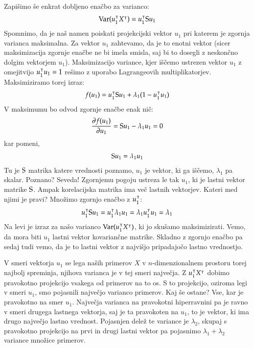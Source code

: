 Zapišimo še enkrat dobljeno enačbo za varianco:
\begin{equation}
  \mathrm{Var}(u_1^\intercal X^\intercal) = u_1^\intercal {\rm S} u_1
\end{equation}
%
Spomnimo, da je naš namen poiskati projekcijski vektor $u_1$ pri katerem je zgornja varianca maksimalna. Za vektor $u_1$ zahtevamo, da je to enotni vektor (sicer maksimizacija zgornje enačbe ne bi imela smisla, saj bi to dosegli z neskončno dolgim vektorjem $u_1$). Maksimizacijo variance, kjer iščemo ustrezen vektor $u_1$ z omejitvijo $u_1^\intercal u_1=1$ rešimo z uporabo Lagrangeovih multiplikatorjev. Maksimiziramo torej izraz:
%
\begin{equation}
  f(u_1) = u_1^\intercal {\rm S} u_1 + \lambda_1(1-u_1^\intercal u_1)
\end{equation}
%
V maksimumu bo odvod zgornje enačbe enak nič:
\begin{equation}
  \frac{\partial f(u_1)}{\partial u_1}={\rm S} u_1 - \lambda_1 u_1=0
\end{equation}
%
kar pomeni,
\begin{equation}
  {\rm S} u_1=\lambda_1 u_1
\end{equation}
%
Tu je ${\rm S}$ matrika katere vrednosti poznamo, $u_1$ je vektor, ki ga iščemo, $\lambda_1$ pa skalar. Poznano? Seveda! Zgornjemu pogoju ustreza le tak $u_1$, ki je lastni vektor matrike ${\rm S}$. Ampak korelacijska matrika ima več lastnih vektorjev. Kateri med njimi je pravi? Množimo zgornjo enačbo z $u_1^\intercal$:
%
\begin{equation}
  u_1^\intercal {\rm S} u_1 = u_1^\intercal \lambda_1 u_1=\lambda_1 u_1^\intercal u_1=\lambda_1
\end{equation}
%
Na levi je izraz za našo varianco $\mathrm{Var}(u_1^\intercal X^\intercal)$, ki jo skušamo maksimizirati. Vemo, da mora biti $u_1$ lastni vektor kovariančne matrike. Skladno z zgornjo enačbo pa sedaj tudi vemo, da je to lastni vektor z najvišjo pripadajočo lastno vrednostjo.

V smeri vektorja $u_1$ se lega naših primerov $X$ v $n$-dimenzionalnem prostoru torej najbolj spreminja, njihova varianca je v tej smeri največja. Z $u_1^\intercal X^\intercal$ dobimo pravokotno projekcijo vsakega od primerov na to os. S to projekcijo, oziroma legi v smeri $u_1$, smo pojasnili največjo varianco primerov. Kaj še ostane? Vse, kar je pravokotno na smer $u_1$. Največja varianca na pravokotni hiperravnini pa je ravno v smeri drugega lastnega vektorja, saj je ta pravokoten na $u_1$, to je vektor, ki ima drugo največjo lastno vrednost. Pojasnjen delež te variance je $\lambda_2$, skupaj s pravokotno projekcijo na prvi in drugi lastni vektor pa pojasnimo $\lambda_1+\lambda_2$ variance množice primerov.

